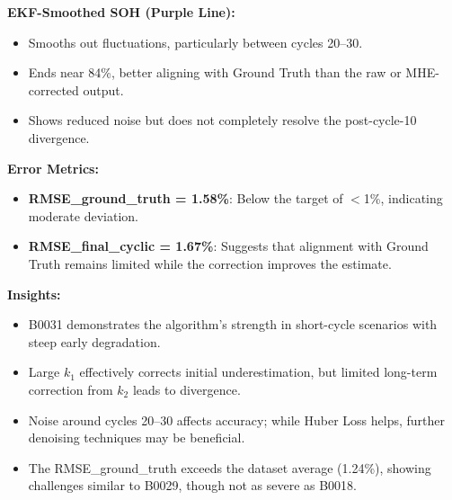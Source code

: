 \vspace{0.5em}
\textbf{EKF-Smoothed SOH (Purple Line):}
\begin{itemize}
    \item Smooths out fluctuations, particularly between cycles 20--30.
    \item Ends near 84\%, better aligning with Ground Truth than the raw or MHE-corrected output.
    \item Shows reduced noise but does not completely resolve the post-cycle-10 divergence.
\end{itemize}

\vspace{0.5em}
\textbf{Error Metrics:}
\begin{itemize}
    \item \textbf{RMSE\_ground\_truth = 1.58\%}: Below the target of $<$1\%, indicating moderate deviation.
    \item \textbf{RMSE\_final\_cyclic = 1.67\%}: Suggests that alignment with Ground Truth remains limited while the correction improves the estimate.
\end{itemize}

\vspace{0.5em}
\textbf{Insights:}
\begin{itemize}
    \item B0031 demonstrates the algorithm's strength in short-cycle scenarios with steep early degradation.
    \item Large $k_1$ effectively corrects initial underestimation, but limited long-term correction from $k_2$ leads to divergence.
    \item Noise around cycles 20--30 affects accuracy; while Huber Loss helps, further denoising techniques may be beneficial.
    \item The RMSE\_ground\_truth exceeds the dataset average (1.24\%), showing challenges similar to B0029, though not as severe as B0018.
\end{itemize}

